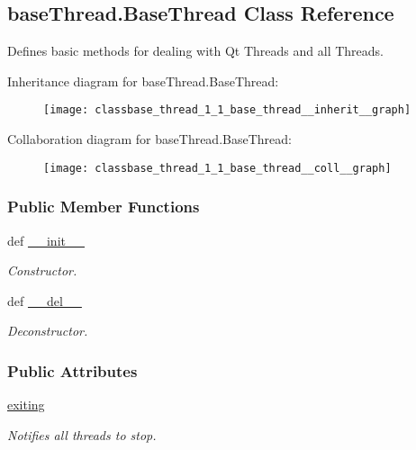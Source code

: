 \hypertarget{classbase_thread_1_1_base_thread}{\subsection{base\-Thread.\-Base\-Thread Class Reference}
\label{classbase_thread_1_1_base_thread}
}


Defines basic methods for dealing with Qt Threads and all Threads.  




Inheritance diagram for base\-Thread.\-Base\-Thread\-:\nopagebreak
\begin{figure}[H]
\begin{center}
\leavevmode
\texttt{[image: classbase\_thread\_1\_1\_base\_thread\_\_inherit\_\_graph]}
\end{center}
\end{figure}


Collaboration diagram for base\-Thread.\-Base\-Thread\-:\nopagebreak
\begin{figure}[H]
\begin{center}
\leavevmode
\texttt{[image: classbase\_thread\_1\_1\_base\_thread\_\_coll\_\_graph]}
\end{center}
\end{figure}
\subsubsection*{Public Member Functions}
\begin{DoxyCompactItemize}
\item 
def \hyperlink{classbase_thread_1_1_base_thread_a822975cc7b8816f501bfd1b71f6256b3}{\-\_\-\-\_\-init\-\_\-\-\_\-}
\begin{DoxyCompactList}\small\item\em Constructor. \end{DoxyCompactList}\item 
def \hyperlink{classbase_thread_1_1_base_thread_a5c6a3cad56112212c8106a205d0be359}{\-\_\-\-\_\-del\-\_\-\-\_\-}
\begin{DoxyCompactList}\small\item\em Deconstructor. \end{DoxyCompactList}\end{DoxyCompactItemize}
\subsubsection*{Public Attributes}
\begin{DoxyCompactItemize}
\item 
\hypertarget{classbase_thread_1_1_base_thread_af914ab68bce2b84935aa1b8246173114}{\hyperlink{classbase_thread_1_1_base_thread_af914ab68bce2b84935aa1b8246173114}{exiting}}\label{classbase_thread_1_1_base_thread_af914ab68bce2b84935aa1b8246173114}

\begin{DoxyCompactList}\small\item\em Notifies all threads to stop. \end{DoxyCompactList}\end{DoxyCompactItemize}


